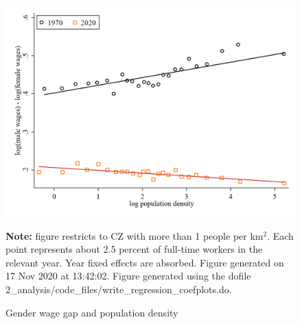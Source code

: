 \begin{figure}[!h]
\centering
\caption{Gender wage gap and population density}
\includegraphics[width=1\textwidth]{../2_analysis/output/figures/l_czone_density_1970_vs_2020_level}
\par \begin{minipage}[h]{\textwidth}{\tiny\textbf{Note:} figure restricts to CZ with more than 1 people per km$^2$. Each point represents about 2.5 percent of full-time workers in the relevant year. Year fixed effects are absorbed. Figure generated on 17 Nov 2020 at 13:42:02. Figure generated using the dofile 2\_analysis/code\_files/write\_regression\_coefplots.do.}\end{minipage}
\end{figure}
